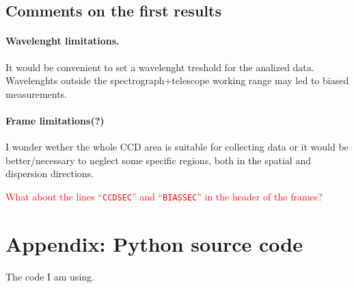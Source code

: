 \documentclass{article}
\begin{document}
\subsection{Comments on the first results}
\paragraph{Wavelenght limitations.} It would be convenient to set a wavelenght treshold for the analized data. Wavelenghts outside the spectrograph+telescope working range may led to biased measurements.

\paragraph{Frame limitations(?)} I wonder wether the whole CCD area is suitable for collecting data or it would be better/necessary to neglect some specific regions, both in the spatial and dispersion directions.

\textcolor{red}{What about the lines ``\texttt{CCDSEC}'' and ``\texttt{BIASSEC}'' in the header of the frames?}

\newpage
\section{Appendix: Python source code}
The code I am using.

\end{document}
